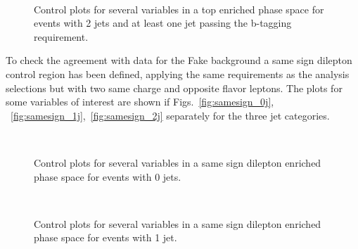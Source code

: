 \begin{figure}[!h]
\centering
{}
\\
\caption{Control plots for several variables in a top enriched phase space for events with 2 jets and at least one jet passing the b-tagging requirement.}\label{fig:top_2jet}
\end{figure}


To check the agreement with data for the Fake background a same sign dilepton control region has been defined, applying the same requirements as the analysis selections but with two same charge and opposite flavor leptons. The plots for some variables of interest are shown if Figs.~\ref{fig:samesign_0j}, ~\ref{fig:samesign_1j},~\ref{fig:samesign_2j} separately for the three jet categories.

\begin{figure}[!h]
\centering
{}
\\
\caption{Control plots for several variables in a same sign dilepton enriched phase space for events with 0 jets.}\label{fig:samesign_0jet}
\end{figure}

\begin{figure}[!h]
\centering
{}
\\
\caption{Control plots for several variables in a same sign dilepton enriched phase space for events with 1 jet.}\label{fig:samesign_1jet}
\end{figure}

